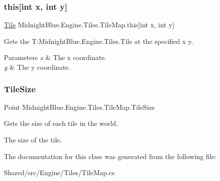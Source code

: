 \subsubsection{\texorpdfstring{this[int x, int y]}{this[int x, int y]}}
{\footnotesize\ttfamily \hyperlink{class_midnight_blue_1_1_tile}{Tile} Midnight\+Blue.\+Engine.\+Tiles.\+Tile\+Map.\+this\mbox{[}int x, int y\mbox{]}\hspace{0.3cm}{\ttfamily [get]}}



Gets the T\+:\+Midnight\+Blue.\+Engine.\+Tiles.\+Tile at the specified x y. 


\begin{DoxyParams}{Parameters}
{\em x} & The x coordinate.\\
\hline
{\em y} & The y coordinate.\\
\hline
\end{DoxyParams}
\hypertarget{class_midnight_blue_1_1_engine_1_1_tiles_1_1_tile_map_a5401474616db996c4755c634cdd056eb}{}\label{class_midnight_blue_1_1_engine_1_1_tiles_1_1_tile_map_a5401474616db996c4755c634cdd056eb} 
\subsubsection{\texorpdfstring{Tile\+Size}{TileSize}}
{\footnotesize\ttfamily Point Midnight\+Blue.\+Engine.\+Tiles.\+Tile\+Map.\+Tile\+Size\hspace{0.3cm}{\ttfamily [get]}}



Gets the size of each tile in the world. 

The size of the tile.

The documentation for this class was generated from the following file\+:\begin{DoxyCompactItemize}
\item 
Shared/src/\+Engine/\+Tiles/Tile\+Map.\+cs\end{DoxyCompactItemize}
